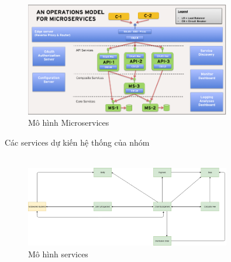 		\begin{figure}[!ht]
			\includegraphics[width=0.8\textwidth]{Images/model-microservice.png}
			\centering
			\linebreak
			\caption{Mô hình Microservices}
		\end{figure}
		Các services dự kiến hệ thống của nhóm\\\\
		\begin{figure}[!ht]
			\includegraphics[width=0.8\textwidth]{Images/architecture.png}
			\centering
			\linebreak
			\caption{Mô hình services}
		\end{figure}\\
